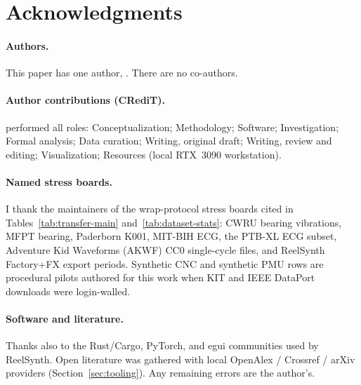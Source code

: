 \section*{Acknowledgments}
\label{sec:acknowledgments}

\paragraph{Authors.}
This paper has one author, \authorname{}. There are no co-authors.

\paragraph{Author contributions (CRediT).}
\authorname{} performed all roles: Conceptualization; Methodology; Software; Investigation; Formal analysis; Data curation; Writing, original draft; Writing, review and editing; Visualization; Resources (local RTX~3090 workstation).

\paragraph{Named stress boards.}
I thank the maintainers of the wrap-protocol stress boards cited in Tables~\ref{tab:transfer-main} and~\ref{tab:dataset-stats}:
CWRU bearing vibrations, MFPT bearing, Paderborn K001, MIT-BIH ECG, the PTB-XL ECG subset, Adventure Kid Waveforms (AKWF) CC0 single-cycle files, and ReelSynth Factory+FX export periods.
Synthetic CNC and synthetic PMU rows are procedural pilots authored for this work when KIT and IEEE DataPort downloads were login-walled.

\paragraph{Software and literature.}
Thanks also to the Rust/Cargo, PyTorch, and egui communities used by ReelSynth.
Open literature was gathered with local OpenAlex / Crossref / arXiv providers (Section~\ref{sec:tooling}).
Any remaining errors are the author's.
